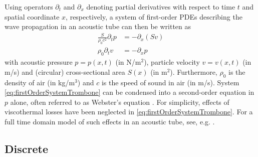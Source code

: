 Using operators $\partial_t$ and $\partial_x$ denoting partial derivatives with respect to time $t$ and spatial coordinate $x$, respectively, a system of first-order PDEs describing the wave propagation in an acoustic tube can then be written as \citeP[A]
\begin{subequations}\label{eq:firstOrderSystemTrombone}
    \begin{align}
        \frac{S}{\rho_0 c^2}\partial_t p &= -\partial_x(Sv)\label{eq:contPressureTrombone}\\
        \rho_0\partial_tv &= -\partial_xp\label{eq:contVelocityTrombone}
    \end{align}
\end{subequations}
with acoustic pressure $p = p(x,t)$ (in N/m$^2$), particle velocity $v = v(x,t)$ (in m/s) and (circular) cross-sectional area $S(x)$ (in m$^2$). Furthermore, $\rho_0$ is the density of air (in kg/m$^3$) and $c$ is the speed of sound in air (in m/s). System \eqref{eq:firstOrderSystemTrombone} can be condensed into a second-order equation in $p$ alone, often referred to as Webster's equation \cite{Webster19}.    For simplicity, effects of viscothermal losses have been neglected in \eqref{eq:firstOrderSystemTrombone}. For a full time domain model of such effects in an acoustic tube, see, e.g. \cite{Bilbao2016}. 
\subsection{Discrete}


